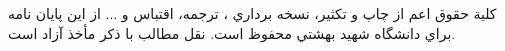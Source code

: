 \ \\ \\ \\ \\ \\ \\ \\
{
\begin{center}
كلية حقوق اعم از چاپ و تكثير، نسخه برداري ، ترجمه، اقتباس و ... از اين پايان نامه براي دانشگاه شهيد بهشتي محفوظ است.
 نقل  مطالب با ذكر مأخذ آزاد است.
\end{center}
}